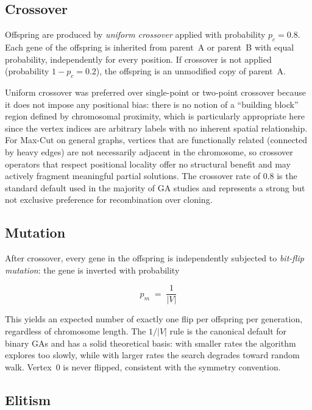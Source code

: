 \documentclass[12pt]{article}
\begin{document}
\subsection{Crossover}

Offspring are produced by \emph{uniform crossover} applied with probability
$p_c = 0.8$.
Each gene of the offspring is inherited from parent~A or parent~B with equal
probability, independently for every position.
If crossover is not applied (probability $1 - p_c = 0.2$), the offspring is an
unmodified copy of parent~A.

Uniform crossover was preferred over single-point or two-point crossover because
it does not impose any positional bias: there is no notion of a ``building block''
region defined by chromosomal proximity, which is particularly appropriate here
since the vertex indices are arbitrary labels with no inherent spatial relationship.
For Max-Cut on general graphs, vertices that are functionally related (connected by
heavy edges) are not necessarily adjacent in the chromosome, so crossover operators
that respect positional locality offer no structural benefit and may actively
fragment meaningful partial solutions.
The crossover rate of $0.8$ is the standard default used in the majority of GA
studies and represents a strong but not exclusive preference for recombination over
cloning.

\subsection{Mutation}

After crossover, every gene in the offspring is independently subjected to
\emph{bit-flip mutation}: the gene is inverted with probability

\begin{equation}
    p_m \;=\; \frac{1}{|V|}
\end{equation}

This yields an expected number of exactly one flip per offspring per generation,
regardless of chromosome length.
The $1/|V|$ rule is the canonical default for binary GAs and has a solid theoretical
basis: with smaller rates the algorithm explores too slowly, while with larger rates
the search degrades toward random walk.
Vertex~0 is never flipped, consistent with the symmetry convention.

\subsection{Elitism}
\end{document}
